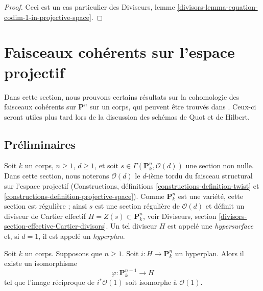 \begin{proof}
Ceci est un cas particulier des Diviseurs, lemme
\ref{divisors-lemma-equation-codim-1-in-projective-space}.
\end{proof}




\section{Faisceaux cohérents sur l'espace projectif}
\label{section-coherent-Pn}

\noindent
Dans cette section, nous prouvons certains résultats sur la
cohomologie des faisceaux cohérents sur $\mathbf{P}^n$ sur un
corps, qui peuvent être trouvés dans \cite{Mum}. Ceux-ci seront
utiles plus tard lors de la discussion des schémas de Quot et de Hilbert.

\subsection{Préliminaires}
\label{subsection-preliminaries}

\noindent
Soit $k$ un corps, $n \geq 1$, $d \geq 1$, et soit $s \in
\Gamma(\mathbf{P}_k^n, \mathcal{O}(d))$ une section non
nulle. Dans cette section, nous noterons $\mathcal{O}(d)$ le
$d$-ième tordu du faisceau structural sur l'espace projectif
(Constructions, définitions
\ref{constructions-definition-twist} et
\ref{constructions-definition-projective-space}). Comme $\mathbf{P}^n_k$
est une variété, cette section est régulière ; ainsi $s$ est une section
régulière de $\mathcal{O}(d)$ et définit un diviseur de Cartier effectif
$H = Z(s) \subset \mathbf{P}^n_k$, voir Diviseurs, section
\ref{divisors-section-effective-Cartier-divisors}. Un tel diviseur $H$ est
appelé une {\it hypersurface} et, si $d = 1$, il est appelé un {\it hyperplan}.

\begin{lemma}
\label{lemma-hyperplane}
Soit $k$ un corps. Supposons
que $n \geq 1$. Soit $i : H \to \mathbf{P}^n_k$
un hyperplan. Alors il existe un isomorphisme
$$
\varphi : \mathbf{P}^{n - 1}_k \longrightarrow H
$$
tel que l'image réciproque de $i^*\mathcal{O}(1)$ soit isomorphe à $\mathcal{O}(1)$.
\end{lemma}

